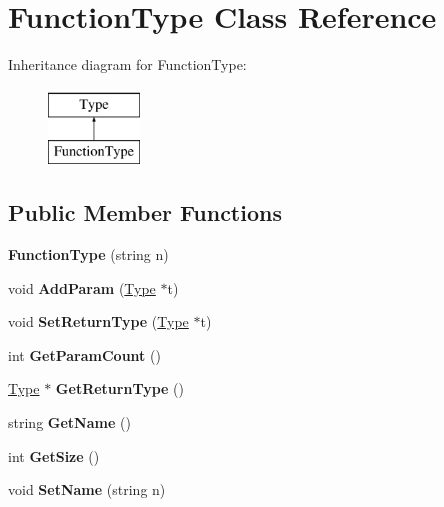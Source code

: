 \hypertarget{classFunctionType}{\section{Function\-Type Class Reference}
\label{classFunctionType}
}
Inheritance diagram for Function\-Type\-:\begin{figure}[H]
\begin{center}
\leavevmode
\includegraphics[height=2.000000cm]{classFunctionType}
\end{center}
\end{figure}
\subsection*{Public Member Functions}
\begin{DoxyCompactItemize}
\item 
\hypertarget{classFunctionType_a924981ea6fc18a7a9ed4cb5c94a136d6}{{\bfseries Function\-Type} (string n)}\label{classFunctionType_a924981ea6fc18a7a9ed4cb5c94a136d6}

\item 
\hypertarget{classFunctionType_a9259c94250b6cb903c6013bc10a0b7bc}{void {\bfseries Add\-Param} (\hyperlink{classType}{Type} $\ast$t)}\label{classFunctionType_a9259c94250b6cb903c6013bc10a0b7bc}

\item 
\hypertarget{classFunctionType_a1462775c5732b70b07c689ab7088814d}{void {\bfseries Set\-Return\-Type} (\hyperlink{classType}{Type} $\ast$t)}\label{classFunctionType_a1462775c5732b70b07c689ab7088814d}

\item 
\hypertarget{classFunctionType_a8b6fed7ff4d79b5db3d39cd042326090}{int {\bfseries Get\-Param\-Count} ()}\label{classFunctionType_a8b6fed7ff4d79b5db3d39cd042326090}

\item 
\hypertarget{classFunctionType_a601e763553086c0d7a4c2de97d6de2bc}{\hyperlink{classType}{Type} $\ast$ {\bfseries Get\-Return\-Type} ()}\label{classFunctionType_a601e763553086c0d7a4c2de97d6de2bc}

\item 
\hypertarget{classType_a8143fe4686ae1a5709a5955396c6ee26}{string {\bfseries Get\-Name} ()}\label{classType_a8143fe4686ae1a5709a5955396c6ee26}

\item 
\hypertarget{classType_afe0fca035825759785b525d2a24f69fe}{int {\bfseries Get\-Size} ()}\label{classType_afe0fca035825759785b525d2a24f69fe}

\item 
\hypertarget{classType_ab8d2328a3a76289edf42b9bf0d4f278f}{void {\bfseries Set\-Name} (string n)}\label{classType_ab8d2328a3a76289edf42b9bf0d4f278f}

\end{DoxyCompactItemize}
